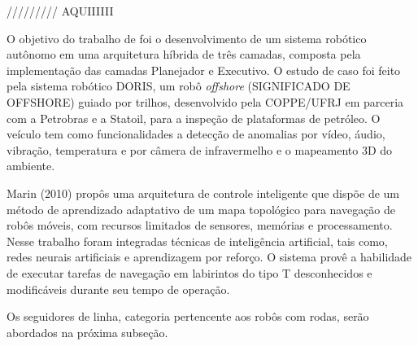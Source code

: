 \begin{itemize}
///////// AQUIIIIII

O objetivo do trabalho de  foi o desenvolvimento de um sistema robótico autônomo em uma 
arquitetura híbrida de três camadas, composta pela implementação das camadas Planejador e Executivo. 
O estudo de caso foi feito pela sistema robótico DORIS, um robô \textit{offshore} (SIGNIFICADO DE OFFSHORE) guiado por trilhos, 
desenvolvido pela COPPE/UFRJ em parceria com a Petrobras e a Statoil, para a inspeção de plataformas de petróleo. O veículo 
tem como funcionalidades a detecção de anomalias por vídeo, áudio, vibração, temperatura e por câmera de infravermelho e o 
mapeamento 3D do ambiente.




Marin (2010) propôs uma arquitetura de controle inteligente que dispõe de
um método de aprendizado adaptativo de um mapa topológico para navegação de
robôs móveis, com recursos limitados de sensores, memórias e processamento.
Nesse trabalho foram integradas técnicas de inteligência artificial, tais como, redes
neurais artificiais e aprendizagem por reforço. O sistema provê a habilidade de
executar tarefas de navegação em labirintos do tipo T desconhecidos e modificáveis
durante seu tempo de operação.


\end{itemize}

Os seguidores de linha, categoria pertencente aos robôs com rodas, serão abordados na próxima subseção.

